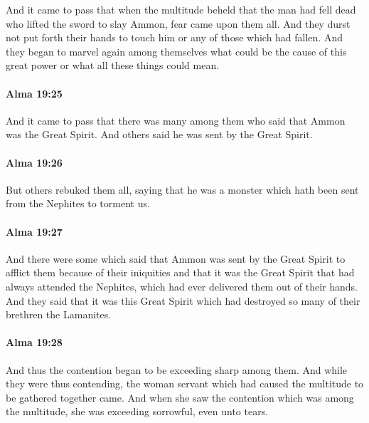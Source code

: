 			And it came to pass that when the multitude beheld
			that the man had fell dead who lifted the sword to slay Ammon,
			fear came upon them all.
			And they durst not put forth their hands to touch him
			or any of those which had fallen.
			And they began to marvel again among themselves
			what could be the cause of this great power
			or what all these things could mean.

		\paragraph{Alma 19:25} %
			\label{ALMA-19-25}

			And it came to pass that there was many among them
			who said that Ammon was the Great Spirit.
			And others said he was sent by the Great Spirit.

		\paragraph{Alma 19:26} %
			\label{ALMA-19-26}

			But others rebuked them all,
			saying that he was a monster
			which hath been sent from the Nephites to torment us.

		\paragraph{Alma 19:27} %
			\label{ALMA-19-27}

			And there were some which said
			that Ammon was sent by the Great Spirit to afflict them because of their iniquities
			and that it was the Great Spirit that had always attended the Nephites,
			which had ever delivered them out of their hands.
			And they said that it was this Great Spirit
			which had destroyed so many of their brethren the Lamanites.

		\paragraph{Alma 19:28} %
			\label{ALMA-19-28}

			And thus the contention began to be exceeding sharp among them.
			And while they were thus contending,
			the woman servant which had caused the multitude to be gathered together came.
			And when she saw the contention which was among the multitude,
			she was exceeding sorrowful, even unto tears.

